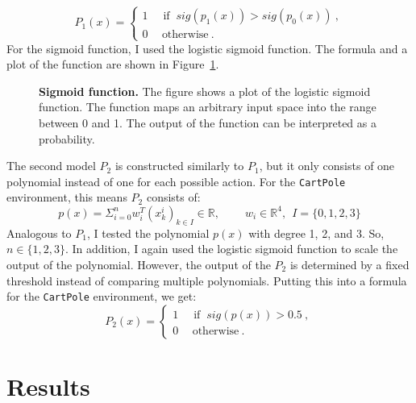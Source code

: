 \[
  P_1(x) =
  \begin{cases}1~&{\text{ if }}~sig(p_1(x)) > sig(p_0(x))~,\\0~&~\text{otherwise}~.\end{cases}
\]
For the sigmoid function, I used the logistic sigmoid function. The formula and a plot of the function are shown in Figure~\ref{fig:sigmoid}.

\begin{figure}[ht]
\centering
{}
\caption[Sigmoid function]{
  \textbf{Sigmoid function.}
  The figure shows a plot of the logistic sigmoid function. The function maps an arbitrary input space into the range between 0 and 1. The output of the function can be interpreted as a probability.
}
\label{fig:sigmoid}
\end{figure}


The second model $P_2$ is constructed similarly to $P_1$, but it only consists of one polynomial instead of one for each possible action. For the \verb|CartPole| environment, this means $P_2$ consists of:
\[
  p(x) = \Sigma_{i=0}^{n} w_i^T (x_k^i)_{k \in I} \in \mathbb{R}, \ \ \ \ \ \ \ \ \ \ w_i \in \mathbb{R}^4, \ \ I = \{0, 1, 2, 3\}
\]
Analogous to $P_1$, I tested the polynomial $p(x)$ with degree 1, 2, and 3. So, $n \in \{1, 2, 3\}$. In addition, I again used the logistic sigmoid function to scale the output of the polynomial. However, the output of the $P_2$ is determined by a fixed threshold instead of comparing multiple polynomials. Putting this into a formula for the \verb|CartPole| environment, we get:
\[
  P_2(x) =
  \begin{cases}1~&{\text{ if }}~sig(p(x))>0.5~,\\0~&~\text{otherwise}~.\end{cases}
\]


\section{Results}
